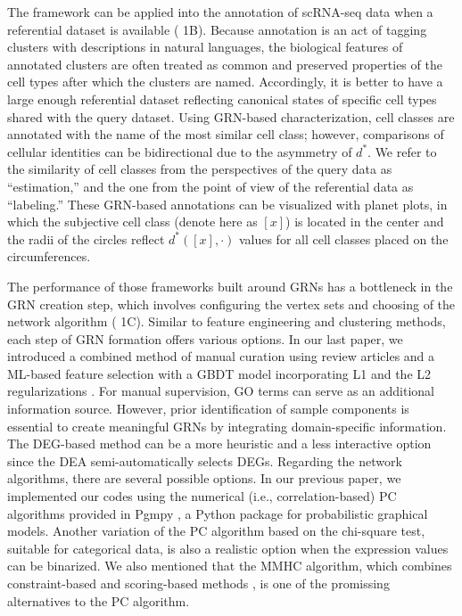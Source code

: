 \documentclass{article}
\begin{document}
The framework can be applied into the annotation of scRNA-seq data when a referential dataset is available 
(\figurename{ 1B}). Because annotation is an act of tagging clusters with descriptions in natural languages, the biological 
features of annotated clusters are often treated as common and preserved properties of the cell types after which 
the clusters are named. Accordingly, it is better to have a large enough referential dataset reflecting canonical 
states of specific cell types shared with the query dataset. Using GRN-based characterization, cell classes are annotated 
with the name of the most similar cell class; however, comparisons of cellular identities can be bidirectional due to the 
asymmetry of $d^*$. We refer to the similarity of cell classes from the perspectives of the query data as ``estimation,'' 
and the one from the point of view of the referential data as ``labeling.'' These GRN-based annotations can be 
visualized with planet plots, in which the subjective cell class (denote here as $[x]$) is located in the center and the 
radii of the circles reflect $d^*([x],\cdot)$ values for all cell classes placed on the circumferences.

The performance of those frameworks built around GRNs has a bottleneck in the GRN creation step, which 
involves configuring the vertex sets and choosing of the network algorithm (\figurename{ 1C}). Similar to feature engineering 
and clustering methods, each step of GRN formation offers various options. In our last paper, we introduced a 
combined method of manual curation using review articles and a \ac{ML}-based feature selection 
with a \ac{GBDT} model incorporating L1 and the L2 regularizations \cite{okano2023set}. For manual 
supervision, \ac{GO} terms can serve as an additional information source. However, prior identification of sample 
components is essential to create meaningful GRNs by integrating domain-specific information. The \ac{DEG}-based 
method can be a more heuristic and a less interactive option since the \ac{DEA} 
semi-automatically selects DEGs. Regarding the network algorithms, there are several 
possible options. In our previous paper, we implemented our codes using the numerical (i.e., correlation-based) PC 
algorithms provided in Pgmpy \cite{pgmpy}, a Python package for probabilistic graphical models. Another variation of 
the PC algorithm based on the chi-square test, suitable for categorical data, is also a realistic option when the 
expression values can be binarized. We also mentioned that the \ac{MMHC} algorithm, which 
combines constraint-based and scoring-based methods \cite{tsamardinos2006max}, is one of the promissing alternatives to the PC algorithm.
\end{document}
